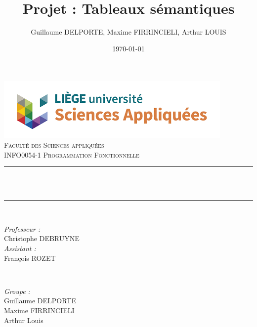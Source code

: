 \documentclass{article}
\begin{document}

\title{Projet : Tableaux sémantiques}								%
\author{Guillaume DELPORTE, Maxime FIRRINCIELI, Arthur LOUIS}								%
\date{\today}											%

\makeatletter
\let\thetitle\@title
\let\theauthor\@author
\let\thedate\@date
\makeatother

\pagestyle{fancy}
\fancyhf{}
\rhead{\theauthor}
\lhead{\thetitle}
\cfoot{\thepage}

\begin{titlepage}
	\centering
    \vspace*{0.5 cm}
    \includegraphics[scale = 0.7]{facsa.png}\\[1.0 cm]	%
    \textsc{\LARGE \newline\newline Faculté des Sciences appliquées}\\[2.0 cm]	%
	\textsc{\Large INFO0054-1 Programmation Fonctionnelle}\\[0.5 cm]				%
	\rule{\linewidth}{0.2 mm} \\[0.4 cm]
	{ \huge \bfseries \thetitle}\\
	\rule{\linewidth}{0.2 mm} \\[1.5 cm]
	
	\begin{minipage}{0.5\textwidth}
		\begin{flushleft} \large
			\emph{Professeur :}\\
			Christophe DEBRUYNE\\
            \vspace{0.5cm}
            \emph{Assistant :}\\
            François ROZET\\
			\end{flushleft}
			\end{minipage}~
			\begin{minipage}{0.4\textwidth}
            
			\begin{flushright} \large
			\emph{Groupe :} \\
			Guillaume DELPORTE\\
            Maxime FIRRINCIELI\\
            Arthur Louis\\
		\end{flushright}
        
	\end{minipage}\\[2 cm]
	
	
    \thedate
\end{titlepage}
\end{document}
